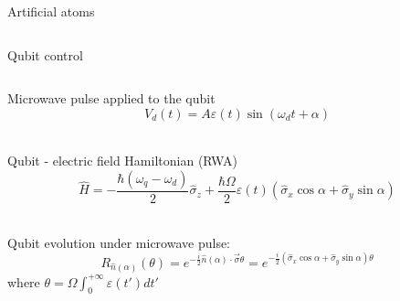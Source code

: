 \documentclass[aspectratio=169,10pt]{beamer}
\begin{document}
\begin{frame}{Artificial atoms}
\begin{columns}
\begin{column}{0.6\textwidth}
    \end{column}
  \end{columns}
\end{frame}

\begin{frame}{Qubit control}

  \begin{columns}
    \begin{column}{0.45\textwidth}
      \small

      Microwave pulse applied to the qubit
      \begin{equation*}
        V_d(t) = A\varepsilon(t)\sin{(\omega_d t + \alpha)}
      \end{equation*}\\
      \vspace{1.5em}

      Qubit - electric field Hamiltonian (RWA)
      \begin{equation*}
        \hat{H} = -\frac{\hbar (\omega_q - \omega_d)}{2} \hat{\sigma}_z + \frac{\hbar \Omega}{2} \varepsilon(t) \left( \hat{\sigma}_x \cos \alpha + \hat{\sigma}_y \sin \alpha \right)
      \end{equation*}\\
      \vspace{1.5em}


      Qubit evolution under microwave pulse:
      \begin{equation*}
        R_{\hat{n}(\alpha)}(\theta) = e^{-\frac{i}{2} \hat{n}(\alpha) \cdot \vec{\sigma} \theta} = e^{-\frac{i}{2} (\hat{\sigma}_x \cos \alpha + \hat{\sigma}_y \sin \alpha) \theta}
      \end{equation*}
      where $\theta = \Omega\int_{0}^{+\infty}\varepsilon(t')dt'$


\end{column}
\end{columns}
\end{frame}
\end{document}

